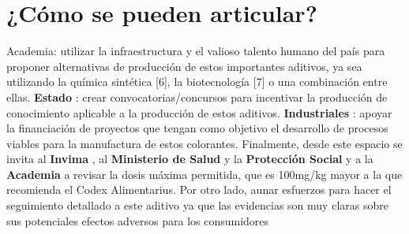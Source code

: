 \documentclass{article}
\begin{document}
\section{¿Cómo se pueden articular?}
Academia: utilizar la infraestructura y el valioso talento humano del país para proponer alternativas de producción de estos importantes aditivos, ya sea utilizando la química sintética [6], la biotecnología [7] o una combinación entre ellas.
\textbf{Estado}
: crear convocatorias/concursos para incentivar la producción de conocimiento aplicable a la producción de estos aditivos.
\textbf{Industriales}
: apoyar la financiación de proyectos que tengan como objetivo el desarrollo de procesos viables para la manufactura de estos colorantes.
Finalmente, desde este espacio se invita al 
\textbf{Invima}
, al 
\textbf{Ministerio de Salud }
y la 
\textbf{Protección Social}
 y a la 
\textbf{Academia}
 a revisar la dosis máxima permitida, que es 100mg/kg mayor a la que recomienda el Codex Alimentarius. Por otro lado, aunar esfuerzos para hacer el seguimiento detallado a este aditivo ya que las evidencias son muy claras sobre sus potenciales efectos adversos para los consumidores
\end{document}
